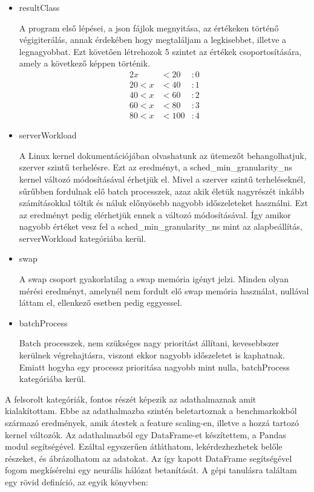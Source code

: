 \begin{itemize}
\item resultClass

A program első lépései, a json fájlok megnyitása, az értékeken történő végigiterálás, annak érdekében hogy megtaláljam a legkisebbet, illetve a legnagyobbat. Ezt követően létrehozok 5 szintet az értékek csoportosítására, amely a következő képpen történik.
\begin{alignat*}{2}
         x& < 20 &: 0 \\
    20 < x& < 40 &: 1 \\
    40 < x& < 60 &: 2 \\
    60 < x& < 80 &: 3 \\
    80 < x& < 100&: 4
\end{alignat*}

\item serverWorkload

A Linux kernel dokumentációjában olvashatunk az ütemezőt behangolhatjuk, szerver szintű terhelésre. Ezt az eredményt, a sched\_min\_granularity\_ns kernel változó módosításával érhetjük el.
Mivel a szerver szintű terheléseknél, sűrűbben fordulnak elő batch processzek, azaz akik életük nagyrészét inkább számításokkal töltik és náluk előnyösebb nagyobb időszeleteket használni. Ezt az eredményt pedig elérhetjük ennek a változó módosításával. Így amikor nagyobb értéket vesz fel a sched\_min\_granularity\_ns mint az alapbeállítás, serverWorkload kategóriába kerül.
\item swap 

A swap csoport gyakorlatilag a swap memória igényt jelzi. 
Minden olyan mérési eredményt, amelynél nem fordult elő swap memória használat, nullával láttam el, ellenkező esetben pedig eggyessel.
\item batchProcess

Batch processzek, nem szükséges nagy prioritást állítani, kevesebbszer kerülnek végrehajtásra, viszont ekkor nagyobb időszeletet is kaphatnak. Emiatt hogyha egy processz prioritása nagyobb mint nulla, batchProcess kategóriába kerül.
\end{itemize}

A felsorolt kategóriák, fontos részét képezik az adathalmaznak amit kialakítottam. Ebbe az adathalmazba szintén beletartoznak a benchmarkokból származó eredmények, amik átestek a feature scaling-en, illetve a hozzá tartozó kernel változók. Az adathalmazból egy DataFrame-et készítettem, a Pandas modul segítségével. Ezáltal egyszerűen átláthatom, lekérdezhezhetek belőle részeket, és ábrázolhatom az adatokat.
Az így kapott DataFrame segítségével fogom megkísérelni egy neurális hálózat betanítását. 
A gépi tanulásra találtam egy rövid definíció, az egyik könyvben:

